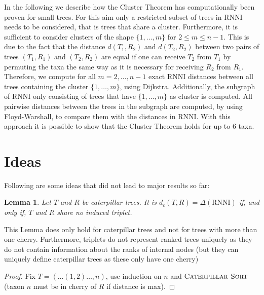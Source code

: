\documentclass{amsart}
\newcommand{\rnni}{\mathrm{RNNI}}
\newcommand{\csort}{\textsc{Caterpillar Sort}}
\newtheorem{lemma}[definition]{Lemma}
\begin{document}
In the following we describe how the Cluster Theorem has computationally been proven for small trees.
For this aim only a restricted subset of trees in $\rnni$ needs to be considered, that is trees that share a cluster.
Furthermore, it is sufficient to consider clusters of the shape $\{1, \ldots, m\}$ for $2 \leq m \leq n-1$.
This is due to the fact that the distance $d(T_1,R_2)$ and $d(T_2,R_2)$ between two pairs of trees $(T_1,R_1)$ and $(T_2,R_2)$ are equal if one can receive $T_2$ from $T_1$ by permuting the taxa the same way as it is necessary for receiving $R_2$ from $R_1$.
Therefore, we compute for all $m = 2, \ldots, n-1$ exact $\rnni$ distances between all trees containing the cluster $\{1, \ldots, m\}$, using Dijkstra.
Additionally, the subgraph of $\rnni$ only consisting of trees that have $\{1, \ldots, m\}$ as cluster is computed.
All pairwise distances between the trees in the subgraph are computed, by using Floyd-Warshall, to compare them with the distances in $\rnni$.
With this approach it is possible to show that the Cluster Theorem holds for up to $6$ taxa. 


\section{Ideas}

Following are some ideas that did not lead to major results so far:

\begin{lemma}
    Let $T$ and $R$ be caterpillar trees.
    It is $d_c(T,R) = \Delta(\rnni)$ if, and only if, $T$ and $R$ share no induced triplet.
\end{lemma}

This Lemma does only hold for caterpillar trees and not for trees with more than one cherry.
Furthermore, triplets do not represent ranked trees uniquely as they do not contain information about the ranks of internal nodes (but they can uniquely define caterpillar trees as these only have one cherry)

\begin{proof}
    Fix $T = (\ldots(1,2) \ldots ,n)$, use induction on $n$ and $\csort$ (taxon $n$ must be in cherry of $R$ if distance is max).
\end{proof}
\end{document}
